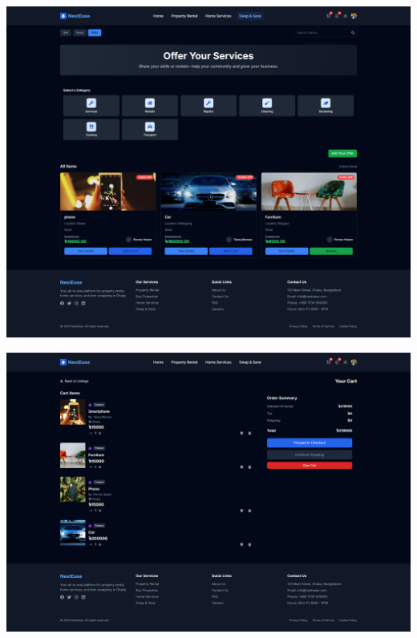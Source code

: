 \documentclass[conference]{IEEEtran}
\begin{document}
\begin{center}
\noindent
\begin{minipage}[t]{0.45\textwidth}
\includegraphics[width=\linewidth]{Project Screenshot/Swap & Save Offer.png}
\end{minipage} \hfill

\noindent
\begin{minipage}[t]{0.45\textwidth}
\includegraphics[width=\linewidth]{Project Screenshot/Cart.png}
\end{minipage}


\end{center}
\end{document}
